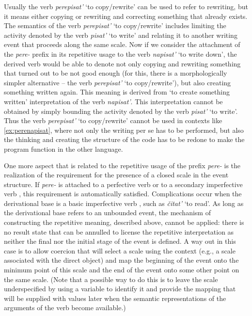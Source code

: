 Usually the verb \textit{perepisat'} `to copy/rewrite' can be used to refer to rewriting, but it means either copying or rewriting and correcting something that already exists. The semantics of the verb \textit{perepisat'} `to copy/rewrite' includes limiting the activity denoted by the verb \textit{pisat'} `to write' and relating it to another writing event that proceeds along the same scale. Now if we consider the attachment of the \textit{pere-}   prefix in its repetitive  usage to the verb \textit{napisat'} `to write down', the derived verb would be able to denote not only copying and rewriting something that turned out to be not good enough (for this, there is a morphologically simpler alternative -- the verb \textit{perepisat'} `to copy/rewrite'), but also creating something written again. This meaning is derived from `to create something written' interpretation of the verb \textit{napisat'}. This interpretation cannot be obtained by simply bounding the activity denoted by the verb \textit{pisat'} `to write'. Thus the verb \textit{perepisat'} `to copy/rewrite' cannot be used in contexts   like \ref{ex:perenapisat}, where not only the writing per se has to be performed, but also the thinking and creating the structure of the code has to be redone to make the program function in the other language.

One more aspect that is related to the repetitive  usage of the prefix \textit{pere-}   is the realization of the requirement for the presence of a closed scale in the event structure. If \textit{pere-}   is attached to a perfective verb  or to a secondary imperfective  verb , this requirement is automatically satisfied. Complications occur when the derivational base is a basic imperfective verb , such as \textit{\v{c}itat'} `to read'. As long as the derivational base refers to an unbounded event, the mechanism of constructing the repetitive  meaning, described above, cannot be applied: there is no result state that can be annulled to license the repetitive  interpretation as neither the final nor the initial stage of the event is defined. A way out in this case is to allow coercion that will select a scale using the context   (e.g., a scale associated with the direct object) and map the beginning of the event onto the minimum point of this scale and the end of the event onto some other point on the same scale. (Note that a possible way to do this is to leave the scale underspecified by using a variable to identify it and provide the mapping that will be supplied with values later when the semantic representations of the arguments of the verb become available.)

